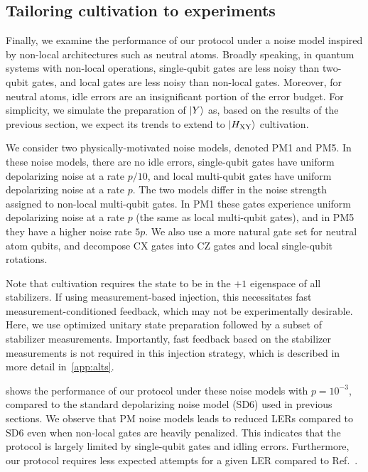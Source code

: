 \documentclass[%
    aps, 
    physrev,
    reprint,
]{revtex4-2}
\newcommand{\XY}{_\mathrm{XY}}
\begin{document}
\subsection{Tailoring cultivation to experiments}\label{sec:nonlocal}

Finally, we examine the performance of our protocol under
a noise model inspired by non-local architectures such as neutral atoms. 
Broadly speaking, in quantum systems with non-local operations, single-qubit gates are less noisy than two-qubit gates, and 
local gates are less noisy than non-local gates. 
Moreover, for neutral atoms, idle errors are an insignificant portion of the error budget. 
For simplicity, we simulate the preparation of $\ket{Y}$ as, based on the results of the previous section, we expect 
its trends to extend to $\ket{H\XY}$ 
cultivation.


We consider two physically{-}motivated noise models, denoted PM1 and PM5.
In these noise models, there are no idle errors, single-qubit gates have
uniform depolarizing noise at a rate $p/10$, and local multi-qubit gates 
have uniform depolarizing noise at a rate $p$.
The two models differ in the noise strength assigned to non-local multi-qubit gates. 
In PM1 these gates experience uniform depolarizing noise at a rate $p$ (the same as local multi-qubit gates), and in PM5 they have a higher noise rate $5p$.
We also use a more natural gate set for neutral atom qubits, and decompose CX gates into CZ gates and local single-qubit rotations. 

Note that cultivation requires the state to be in the $+1$ eigenspace of all stabilizers. 
If using measurement-based injection, this necessitates fast measurement-conditioned feedback, which may not be experimentally desirable. 
Here, we use optimized unitary state preparation followed by a subset of stabilizer measurements. 
Importantly, fast feedback based on the stabilizer measurements is not required in this injection strategy, which is described in more detail in~\cref{app:alts}. 

 shows the performance of our 
protocol under these noise models with $p=10^{-3}$, compared to the standard depolarizing noise model (SD6) used in previous sections.
We observe that PM noise models leads to reduced LERs compared to SD6 even when non-local gates are heavily penalized. 
This indicates that the protocol is largely limited by single-qubit gates and idling errors.
Furthermore, our protocol requires less expected attempts for a given LER compared to Ref.~\cite{vaknin2025magic}.
\end{document}
